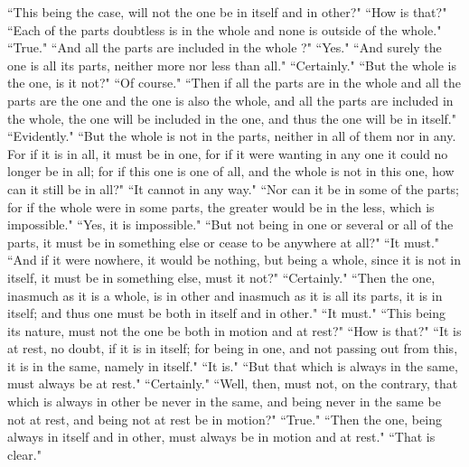 \documentclass[letterpaper,12pt]{article}
\newcommand{\stephpag}[1]{\marginnote{\small\itshape\fontfamily{ppl}\selectfont #1}}
\begin{document}
``This being the case, will not the one be in itself and in other?" ``How is that?" ``Each of the parts doubtless is in the whole and none is outside of the whole." ``True." ``And all the parts are included in the whole ?" \stephpag{c} ``Yes." ``And surely the one is all its parts, neither more nor less than all." ``Certainly." ``But the whole is the one, is it not?" ``Of course." ``Then if all the parts are in the whole and all the parts are the one and the one is also the whole, and all the parts are included in the whole, the one will be included in the one, and thus the one will be in itself." ``Evidently." ``But the whole is not in the parts, neither in all of them nor in any. \stephpag{d} For if it is in all, it must be in one, for if it were wanting in any one it could no longer be in all; for if this one is one of all, and the whole is not in this one, how can it still be in all?" ``It cannot in any way." ``Nor can it be in some of the parts; for if the whole were in some parts, the greater would be in the less, which is impossible." ``Yes, it is impossible." ``But not being in one or several or all of the parts, it must be in something else or cease to be anywhere at all?" ``It must." ``And if it were nowhere, it would be nothing, but being a whole, since it is not in itself, it must be in something else, must it not?" \stephpag{e} ``Certainly." ``Then the one, inasmuch as it is a whole, is in other and inasmuch as it is all its parts, it is in itself; and thus one must be both in itself and in other." ``It must." ``This being its nature, must not the one be both in motion and at rest?" ``How is that?" ``It is at rest, no doubt, if it is in itself; for being in one, \stephpag{146 a} and not passing out from this, it is in the same, namely in itself." ``It is." ``But that which is always in the same, must always be at rest." ``Certainly." ``Well, then, must not, on the contrary, that which is always in other be never in the same, and being never in the same be not at rest, and being not at rest be in motion?" ``True." ``Then the one, being always in itself and in other, must always be in motion and at rest." ``That is clear."
\end{document}
